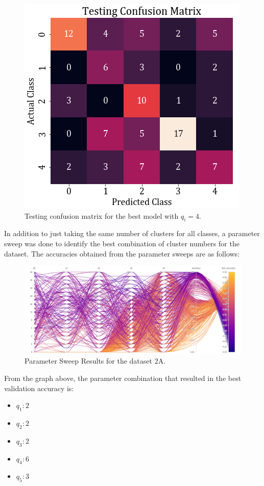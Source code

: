 \documentclass[11pt,a4paper]{article}
\newcommand{\noi}{\noindent}
\begin{document}
\begin{figure}[H]
    \centering
    \includegraphics[scale=0.5]{images/2A/2A_full_test_conf.png}
    \caption{Testing confusion matrix for the best model with $q_i=4$.}
\end{figure}

\noi
In addition to just taking the same number of clusters for all classes, a parameter sweep was done to identify the best combination of cluster numbers for the dataset. The accuracies obtained from the parameter sweeps are as follows:
\begin{figure}[H]
    \centering
    \includegraphics[scale=0.35]{images/2A/2a_parameter_sweep.png}
    \caption{Parameter Sweep Results for the dataset 2A.}
\end{figure}

\noi
From the graph above, the parameter combination that resulted in the best validation accuracy is:
\begin{itemize}
    \itemsep0em
    \item $q_1: 2$
    \item $q_2: 2$
    \item $q_3: 2$
    \item $q_4: 6$
    \item $q_5: 3$
\end{itemize}
\end{document}
